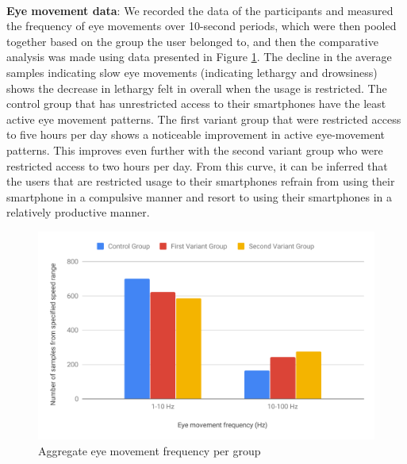 \documentclass{article}
\begin{document}
\paragraph{} \textbf{Eye movement data}: We recorded the data of the participants and measured the frequency of eye movements over 10-second periods, which were then pooled together based on the group the user belonged to, and then the comparative analysis was made using data presented in Figure \ref{fig:res_eye_movement}. The decline in the average samples indicating slow eye movements (indicating lethargy and drowsiness) shows the decrease in lethargy felt in overall when the usage is restricted. The control group that has unrestricted access to their smartphones have the least active eye movement patterns. The first variant group that were restricted access to five hours per day shows a noticeable improvement in active eye-movement patterns. This improves even further with the second variant group who were restricted access to two hours per day. From this curve, it can be inferred that the users that are restricted usage to their smartphones refrain from using their smartphone in a compulsive manner and resort to using their smartphones in a relatively productive manner.

\begin{figure}[hbtp]
    \centering
    \includegraphics[width=\textwidth]{eye.pdf}
    \caption{Aggregate eye movement frequency per group}
    \label{fig:res_eye_movement}
\end{figure}
\end{document}
